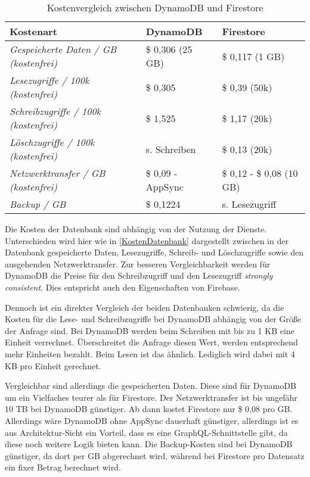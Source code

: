 \begin{table}[h]
  \caption{Kostenvergleich zwischen DynamoDB und Firestore}
  \label{KostenDatenbank}
  \renewcommand{\arraystretch}{1.2}
  \centering
  \sffamily
  \begin{footnotesize}
    \begin{tabularx}{0.9\textwidth}{l l l}
      \toprule
      \textbf{Kostenart} & \textbf{DynamoDB} & \textbf{Firestore}\\
      \midrule
      \emph{Gespeicherte Daten / GB (kostenfrei)} & \$ 0,306 (25 GB) & \$ 0,117 (1 GB) \\
      \emph{Lesezugriffe / 100k (kostenfrei)} & \$ 0,305  & \$ 0,39 (50k) \\
      \emph{Schreibzugriffe / 100k (kostenfrei)} & \$ 1,525  & \$ 1,17 (20k) \\
      \emph{Löschzugriffe / 100k (kostenfrei)} &  s. Schreiben & \$ 0,13 (20k) \\
      \emph{Netzwerktransfer / GB (kostenfrei)} & \$ 0,09 - AppSync & \$ 0,12 - \$ 0,08 (10 GB) \\
      \emph{Backup / GB} & \$ 0,1224 & s. Lesezugriff \\
      \bottomrule
    \end{tabularx}
  \end{footnotesize}
  \rmfamily
\end{table}

Die Kosten der Datenbank sind abhängig von der Nutzung der Dienste. Unterschieden wird hier wie in \autoref{KostenDatenbank} dargestellt zwischen in der Datenbank gespeicherte Daten, Lesezugriffe, Schreib- und Löschzugriffe sowie den ausgehenden Netzwerktransfer. Zur besseren Vergleichbarkeit werden für DynamoDB die Preise für den Schreibzugriff  und den Lesezugriff \textit{strongly consistent}. Dies entspricht auch den Eigenschaften von Firebase.

Dennoch ist ein direkter Vergleich der beiden Datenbanken schwierig, da die Kosten für die Lese- und Schreibzugriffe bei DynamoDB abhängig von der Größe der Anfrage sind. Bei DynamoDB werden beim Schreiben mit bis zu 1 KB eine Einheit verrechnet. Überschreitet die Anfrage diesen Wert, werden entsprechend mehr Einheiten bezahlt. Beim Lesen ist das ähnlich. Lediglich wird dabei mit 4 KB pro Einheit gerechnet.

Vergleichbar sind allerdings die gespeicherten Daten. Diese sind für DynamoDB um ein Vielfaches teurer als für Firestore. Der Netzwerktransfer ist bis ungefähr 10 TB bei DynamoDB günstiger. Ab dann kostet Firestore nur \$ 0,08 pro GB. Allerdings wäre DynamoDB ohne AppSync dauerhaft günstiger, allerdings ist es aus Architektur-Sicht ein Vorteil, dass es eine GraphQL-Schnittstelle gibt, da diese noch weitere Logik bieten kann. Die Backup-Kosten sind bei DynamoDB günstiger, da dort per GB abgerechnet wird, während bei Firestore pro Datensatz ein fixer Betrag berechnet wird.

